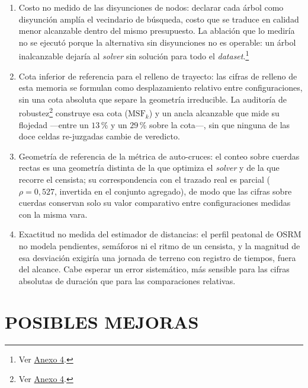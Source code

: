 \begin{enumerate}
\begin{enumerate}
    \item Costo no medido de las disyunciones de nodos: declarar cada árbol como disyunción amplía
        el vecindario de búsqueda, costo que se traduce en calidad menor alcanzable dentro del
        mismo presupuesto. La ablación que lo mediría no se ejecutó porque la alternativa sin
        disyunciones no es operable: un árbol inalcanzable dejaría al \textit{solver} sin solución
        para todo el \textit{dataset}.\footnote{Ver \hyperref[anx:efectos-no-medidos]{Anexo 4}.}

    \item Cota inferior de referencia para el relleno de trayecto: las cifras de relleno de esta
        memoria se formulan como desplazamiento relativo entre configuraciones, sin una cota
        absoluta que separe la geometría irreducible. La auditoría de
        robustez\footnote{Ver \hyperref[anx:auditoria-robustez]{Anexo 4}.} construye esa cota
        ($\text{MSF}_k$) y un ancla alcanzable que mide su flojedad ---entre un $13$\,\% y un
        $29$\,\% sobre la cota---, sin que ninguna de las doce celdas re-juzgadas cambie de
        veredicto.

    \item Geometría de referencia de la métrica de auto-cruces: el conteo sobre cuerdas rectas es
        una geometría distinta de la que optimiza el \textit{solver} y de la que recorre el
        censista; su correspondencia con el trazado real es parcial ($\rho = 0{,}527$, invertida en
        el conjunto agregado), de modo que las cifras sobre cuerdas conservan solo su valor
        comparativo entre configuraciones medidas con la misma vara.

    \item Exactitud no medida del estimador de distancias: el perfil peatonal de OSRM no modela
        pendientes, semáforos ni el ritmo de un censista, y la magnitud de esa desviación exigiría
        una jornada de terreno con registro de tiempos, fuera del alcance. Cabe esperar un error
        sistemático, más sensible para las cifras absolutas de duración que para las comparaciones
        relativas.
  \end{enumerate}

\end{enumerate}

\section{POSIBLES MEJORAS}
\label{sec:posibles-mejoras}

